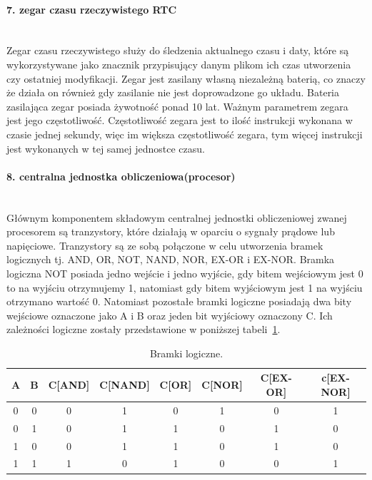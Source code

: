 \documentclass[12p]{article}
\begin{document}
\paragraph{7. zegar czasu rzeczywistego RTC} \mbox{} \\

Zegar czasu rzeczywistego służy do śledzenia aktualnego czasu i daty, które są wykorzystywane jako znacznik przypisujący danym plikom ich czas utworzenia czy ostatniej modyfikacji. Zegar jest zasilany własną niezależną baterią, co znaczy że działa on również gdy zasilanie nie jest doprowadzone go układu. Bateria zasilająca zegar posiada żywotność ponad 10 lat. Ważnym parametrem zegara jest jego częstotliwość. Częstotliwość zegara jest to ilość instrukcji wykonana w czasie jednej sekundy, więc im większa częstotliwość zegara, tym więcej instrukcji jest wykonanych w tej samej jednostce czasu.


\paragraph{8. centralna jednostka obliczeniowa(procesor)} \mbox{} \\

Głównym komponentem składowym centralnej jednostki obliczeniowej zwanej procesorem są tranzystory, które działają w oparciu o sygnały prądowe lub napięciowe. Tranzystory są ze sobą połączone w celu utworzenia bramek logicznych tj. AND, OR, NOT, NAND, NOR, EX-OR i EX-NOR. Bramka logiczna NOT posiada jedno wejście i jedno wyjście, gdy bitem wejściowym jest 0 to na wyjściu otrzymujemy 1, natomiast gdy bitem wyjściowym jest 1 na wyjściu otrzymano wartość 0. Natomiast pozostałe bramki logiczne posiadają dwa bity wejściowe oznaczone jako A i B oraz jeden bit wyjściowy oznaczony C. Ich zależności logiczne zostały przedstawione w poniższej tabeli~\ref{bramki_logiczne}.

\begin{table}[H]
\centering
\begin{tabular}{|c|c|c|c|c|c|c|c|} 
\hline
A& B& C[AND] & C[NAND] & C[OR] & C[NOR] & C[EX-OR] & c[EX-NOR]\\ \hline
0 & 0& 0& 1& 0& 1& 0& 1\\ \hline
0 & 1& 0& 1& 1& 0& 1& 0\\ \hline
1 & 0& 0& 1& 1& 0& 1& 0\\ \hline
1 & 1& 1& 0& 1& 0& 0& 1\\ \hline
\end{tabular}
\caption{Bramki logiczne.}\label{bramki_logiczne}
\end{table}
\end{document}
